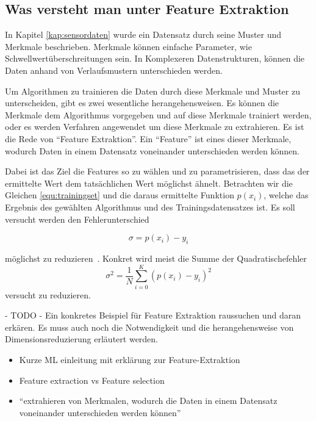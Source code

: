 \subsection{Was versteht man unter Feature Extraktion}\label{kap:featureextraktionuebersicht}
In Kapitel \ref{kap:sensordaten} wurde ein Datensatz durch seine Muster und Merkmale beschrieben. Merkmale können einfache Parameter, wie Schwellwertüberschreitungen sein. In Komplexeren Datenstrukturen, können die Daten anhand von Verlaufsmustern unterschieden werden. 

Um Algorithmen zu trainieren die Daten durch diese Merkmale und Muster zu unterscheiden, gibt es zwei wesentliche herangehensweisen. Es können die Merkmale dem Algorithmus vorgegeben und auf diese Merkmale trainiert werden, oder es werden Verfahren angewendet um diese Merkmale zu extrahieren. Es ist die Rede von \enquote{Feature Extraktion}. Ein \enquote{Feature} ist eines dieser Merkmale, wodurch Daten in einem Datensatz voneinander unterschieden werden können. 

Dabei ist das Ziel die Features so zu wählen und zu parametrisieren, dass das der ermittelte Wert dem tatsächlichen Wert möglichst ähnelt. Betrachten wir die Gleichen \ref{equ:trainingset} und die daraus ermittelte Funktion $p(x_i)$, welche das Ergebnis des gewählten Algorithmus und des Trainingsdatensatzes ist. Es soll versucht werden den Fehlerunterschied

\begin{equation}
  \sigma = p(x_i)-y_i
\end{equation}

möglichst zu reduzieren~\cite{gensler2015fast}. Konkret wird meist die Summe der Quadratischefehler
\begin{equation}
  \sigma^2 = \frac{1}{N} \sum_{i=0}^{K}(p(x_i)-y_i)^2
\end{equation}
versucht zu reduzieren.

\begin{center}
  - TODO - Ein konkretes Beispiel für Feature Extraktion raussuchen und daran erkären. Es muss auch noch die Notwendigkeit und die herangehensweise von Dimensionsreduzierung erläutert werden.
\end{center}

\begin{itemize}
  \item Kurze ML einleitung mit erklärung zur Feature-Extraktion
  \item Feature extraction vs Feature selection
  \item \enquote{extrahieren von Merkmalen, wodurch die Daten in einem Datensatz voneinander unterschieden werden können}
\end{itemize}